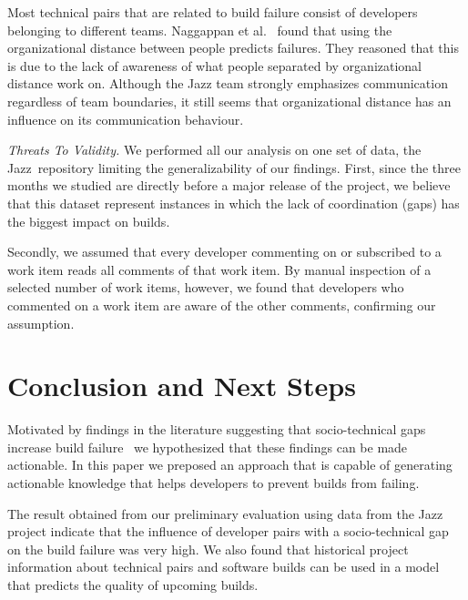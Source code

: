 \documentclass[conference]{IEEEtran}
\begin{document}
Most technical pairs that are related to build failure consist of developers belonging to
different teams. Naggappan et al.~\cite{nagappan:icse:2008} found that using the
organizational distance between people predicts failures. They reasoned that this
is due to the lack of awareness of what people separated by organizational distance
work on. Although the Jazz team strongly emphasizes communication
regardless of team boundaries, it still seems that organizational distance has
an influence on its communication behaviour.

\emph{Threats To Validity.}
\label{sec:threats}
We performed all our analysis on one set of data, the Jazz\texttrademark\
repository limiting  the generalizability of our findings.
First, since the three months  we studied are directly before a major release of the project, 
we believe that this dataset represent instances in which the lack of coordination (gaps) has the biggest impact on builds.

Secondly, we assumed that every developer commenting on or subscribed to a work item reads all comments of that work item. 
By manual inspection of a selected number of work items, however, we found that developers who commented on a work item are aware of the other comments, confirming our assumption.



\section{Conclusion and Next Steps}
Motivated by findings in the literature suggesting that socio-technical gaps increase build failure~\cite{kwan:tse:2011}
we hypothesized that these findings can be made actionable.
In this paper we preposed an approach that is capable of generating actionable knowledge that helps developers to prevent builds from failing.

The result obtained from our preliminary evaluation using data from the Jazz project indicate that 
the influence of developer pairs with a socio-technical gap on the build
failure was very high. 
 We also found
that historical project information about technical pairs and software
builds can be used in a model that predicts the quality of upcoming builds.
\end{document}
